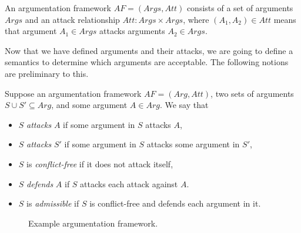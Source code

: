 \begin{definition}
An argumentation framework $AF=(Args,Att)$ consists of a set of arguments $Args$ and an attack relationship $Att:Args\times Args$, where $(A_1,A_2)\in Att$ means that argument $A_1\in Args$ attacks arguments $A_2\in Args$.
\end{definition}

Now that we have defined arguments and their attacks, we are going to define a semantics to determine which arguments are acceptable. The following notions are preliminary to this.

\begin{definition} Suppose an argumentation framework $AF=(Arg,Att)$, two sets of arguments $S\cup S'\subseteq Arg$, and some argument $A\in Arg$. We say that
\begin{itemize}
\item $S$ \emph{attacks} $A$ if some argument in $S$ attacks $A$,
\item $S$ \emph{attacks} $S'$ if some argument in $S$ attacks some argument in $S'$,
\item $S$ is \emph{conflict-free} if it does not attack itself,
\item $S$ \emph{defends} $A$ if $S$ attacks each attack against $A$.
\item $S$ is \emph{admissible} if $S$ is conflict-free and defends each argument in it.
\end{itemize}
\end{definition}


\begin{figure}[ht!]
\centering
{}
\caption{Example argumentation framework.}
\label{fig:goalmodeling:arg2}
\end{figure}

